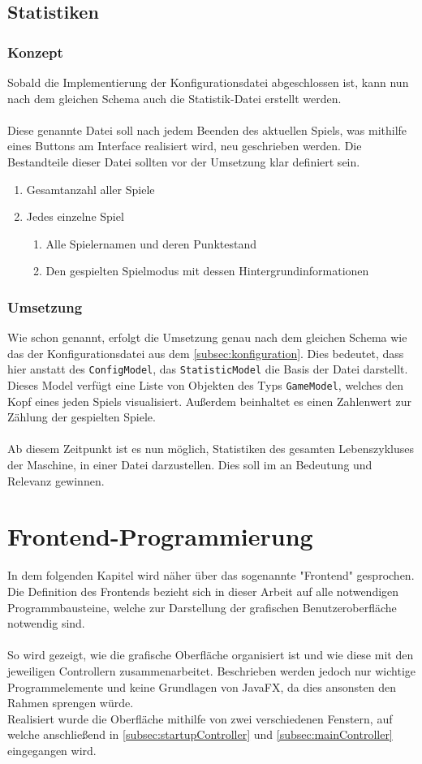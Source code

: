 \subsection{Statistiken}
\subsubsection{Konzept}
Sobald die Implementierung der Konfigurationsdatei abgeschlossen ist, kann nun nach dem gleichen Schema auch die Statistik-Datei erstellt werden.\\\\
Diese genannte Datei soll nach jedem Beenden des aktuellen Spiels, was mithilfe eines Buttons am Interface realisiert wird, neu geschrieben werden.
Die Bestandteile dieser Datei sollten vor der Umsetzung klar definiert sein.
\begin{enumerate}
\item Gesamtanzahl aller Spiele
\item Jedes einzelne Spiel
\begin{enumerate}
\item Alle Spielernamen und deren Punktestand
\item Den gespielten Spielmodus mit dessen Hintergrundinformationen
\end{enumerate}
\end{enumerate}
\subsubsection{Umsetzung}
Wie schon genannt, erfolgt die Umsetzung genau nach dem gleichen Schema wie das der Konfigurationsdatei aus dem \autoref{subsec:konfiguration}.
Dies bedeutet, dass hier anstatt des \lstinline[style=java]{ConfigModel}, das \lstinline[style=java]{StatisticModel} die Basis der Datei darstellt.
Dieses Model verfügt eine Liste von Objekten des Typs \lstinline[style=java]{GameModel}, welches den Kopf eines jeden Spiels visualisiert.
Außerdem beinhaltet es einen Zahlenwert zur Zählung der gespielten Spiele.\\\\
Ab diesem Zeitpunkt ist es nun möglich, Statistiken des gesamten Lebenszykluses der Maschine, in einer Datei darzustellen.
Dies soll im  an Bedeutung und Relevanz gewinnen.
\newpage
\section{Frontend-Programmierung}
In dem folgenden Kapitel wird näher über das sogenannte "Frontend" gesprochen.
Die Definition des Frontends bezieht sich in dieser Arbeit auf alle notwendigen Programmbausteine, welche zur Darstellung der grafischen Benutzeroberfläche notwendig sind.\\\\
So wird gezeigt, wie die grafische Oberfläche organisiert ist und wie diese mit den jeweiligen Controllern zusammenarbeitet.
Beschrieben werden jedoch nur wichtige Programmelemente und keine Grundlagen von JavaFX, da dies ansonsten den Rahmen sprengen würde.\\
Realisiert wurde die Oberfläche mithilfe von zwei verschiedenen Fenstern, auf welche anschließend in \autoref{subsec:startupController} und \autoref{subsec:mainController} eingegangen wird.
